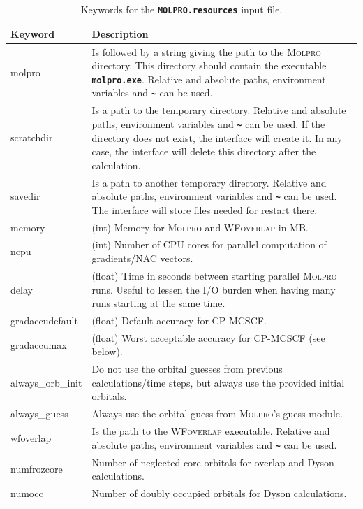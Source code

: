 \documentclass[a4paper,10pt,DIV=15,openany]{scrbook}
\newcommand{\ttt}[1]{\textbf{\texttt{#1}}}
\begin{document}
\begin{table}[t]
  \centering
  \caption{Keywords for the \ttt{MOLPRO.resources} input file.}
  \label{tab:molpro_sh2}
  \begin{tabular}{>{\ttfamily}lp{12cm}}
  \hline
  Keyword       &Description\\
  \hline
  molpro          &Is followed by a string giving the path to the \textsc{Molpro} directory. This directory should contain the executable \ttt{molpro.exe}. Relative and absolute paths, environment variables and \ttt{\textasciitilde} can be used. \\
  scratchdir      &Is a path to the temporary directory. Relative and absolute paths, environment variables and \ttt{\textasciitilde} can be used. If the directory does not exist, the interface will create it. In any case, the interface will delete this directory after the calculation.\\
  savedir         &Is a path to another temporary directory.  Relative and absolute paths, environment variables and \ttt{\textasciitilde} can be used. The interface will store files needed for restart there.\\
  memory        &(int) Memory for \textsc{Molpro} and \textsc{WFoverlap} in MB.\\
  ncpu          &(int) Number of CPU cores for parallel computation of gradients/NAC vectors.\\
  delay         &(float) Time in seconds between starting parallel \textsc{Molpro} runs. Useful to lessen the I/O burden when having many runs starting at the same time.\\
  gradaccudefault &(float) Default accuracy for CP-MCSCF.\\
  gradaccumax     &(float) Worst acceptable accuracy for CP-MCSCF (see below).\\
  always\_orb\_init &Do not use the orbital guesses from previous calculations/time steps, but always use the provided initial orbitals.\\
  always\_guess   &Always use the orbital guess from \textsc{Molpro}'s guess module.\\
  wfoverlap       &Is the path to the \textsc{WFoverlap} executable. Relative and absolute paths, environment variables and \ttt{\textasciitilde} can be used.\\
  numfrozcore           &Number of neglected core orbitals for overlap and Dyson calculations.\\
  numocc           &Number of doubly occupied orbitals for Dyson calculations.\\

\end{tabular}
\end{table}
\end{document}

